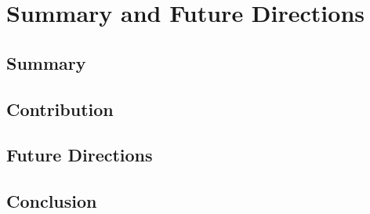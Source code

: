 
\chapter{\color{red}Summary and Future Directions}
\label{cp:conc}


\section{\color{red}Summary}


\section{\color{red}Contribution}


\section{\color{red}Future Directions}


\section{\color{red}Conclusion}

